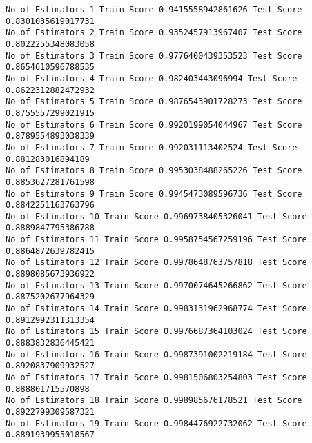 \documentclass[11pt]{article}
\begin{document}
    \begin{Verbatim}[commandchars=\\\{\}]
No of Estimators 1 Train Score 0.9415558942861626 Test Score 0.8301035619017731
No of Estimators 2 Train Score 0.9352457913967407 Test Score 0.8022255348083058
No of Estimators 3 Train Score 0.9776400439353523 Test Score 0.8654610596788535
No of Estimators 4 Train Score 0.982403443096994 Test Score 0.8622312882472932
No of Estimators 5 Train Score 0.9876543901728273 Test Score 0.8755557299021915
No of Estimators 6 Train Score 0.9920199054044967 Test Score 0.8789554893038339
No of Estimators 7 Train Score 0.992031113402524 Test Score 0.881283016894189
No of Estimators 8 Train Score 0.9953038488265226 Test Score 0.8853627281761598
No of Estimators 9 Train Score 0.9945473089596736 Test Score 0.8842251163763796
No of Estimators 10 Train Score 0.9969738405326041 Test Score 0.8889847795386788
No of Estimators 11 Train Score 0.9958754567259196 Test Score 0.8864872639782415
No of Estimators 12 Train Score 0.9978648763757818 Test Score 0.8898085673936922
No of Estimators 13 Train Score 0.9970074645266862 Test Score 0.8875202677964329
No of Estimators 14 Train Score 0.9983131962968774 Test Score 0.8912992311313354
No of Estimators 15 Train Score 0.9976687364103024 Test Score 0.8883832836445421
No of Estimators 16 Train Score 0.9987391002219184 Test Score 0.8920837909932527
No of Estimators 17 Train Score 0.9981506803254803 Test Score 0.888801715570898
No of Estimators 18 Train Score 0.998985676178521 Test Score 0.8922799309587321
No of Estimators 19 Train Score 0.9984476922732062 Test Score 0.8891939955018567

    \end{Verbatim}
\end{document}
